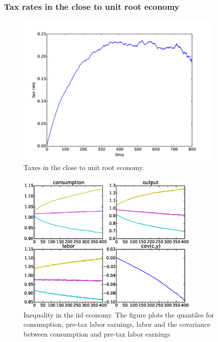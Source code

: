 \documentclass{beamer}
\begin{document}
\begin{frame}
\frametitle {Tax rates in the close to unit root economy}

  \begin{figure}[htp]
 \centering
 \includegraphics[width=0.9\textwidth]{Images/near_unit_tax.pdf}
 \caption{Taxes in the close to unit root economy.}
 \label{fig:taxes_pers}
 \end{figure}
\end{frame}

\begin{frame}
  \begin{figure}[htp]
 \centering
 \includegraphics[width=0.8\textwidth]{Images/quant_iid.eps}
 \caption{Inequality in the iid economy. The figure plots the quantiles for consumption, pre-tax labor earnings, labor and the covariance between consumption and pre-tax labor earnings}
 \label{fig:quant_iid}
 \end{figure}
\end{frame}
\end{document}
